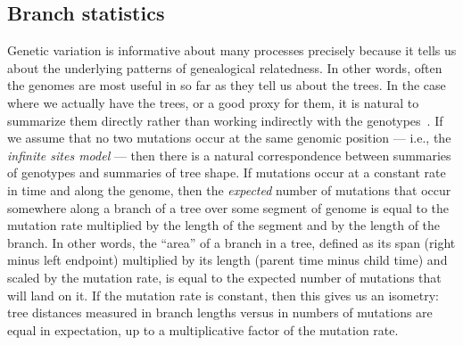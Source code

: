 \documentclass{article}
\begin{document}
\subsection*{Branch statistics}

Genetic variation is informative about many processes
precisely because it tells us about the underlying patterns of genealogical relatedness.
In other words, often the genomes are most useful in so far as they tell us about the trees.
In the case where we actually have the trees, or a good proxy for them,
it is natural to summarize them directly rather than working indirectly with the
genotypes~\citep{harris2019database}.
If we assume that no two mutations occur at the same genomic position ---
i.e., the \emph{infinite sites model} ---
then there is a natural correspondence between summaries of genotypes and summaries of tree shape.
If mutations occur at a constant rate in time and along the genome,
then the \emph{expected} number of mutations that occur somewhere along a branch of a tree
over some segment of genome
is equal to the mutation rate multiplied by the length of the segment and by the length of the branch.
In other words, the ``area'' of a branch in a tree,
defined as its span (right minus left endpoint) multiplied by its length (parent time minus child time)
and scaled by the mutation rate,
is equal to the expected number of mutations that will land on it.
If the mutation rate is constant,
then this gives us an isometry:
tree distances measured in branch lengths versus in numbers of mutations
are equal in expectation, up to a multiplicative factor of the mutation rate.
\end{document}
